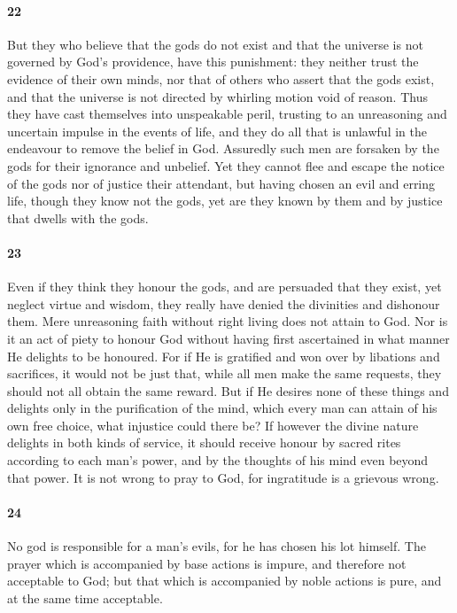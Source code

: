 \documentclass[12pt]{article}
\begin{document}
\paragraph{22} But they who believe that the gods do not exist and that the
universe is not governed by God's providence, have this punishment: they
neither trust the evidence of their own minds, nor that of others who assert
that the gods exist, and that the universe is not directed by whirling motion
void of reason. Thus they have cast themselves into unspeakable peril, trusting
to an unreasoning and uncertain impulse in the events of life, and they do all
that is unlawful in the endeavour to remove the belief in God. Assuredly such
men are forsaken by the gods for their ignorance and unbelief. Yet they cannot
flee and escape the notice of the gods nor of justice their attendant, but
having chosen an evil and erring life, though they know not the gods, yet are
they known by them and by justice that dwells with the gods.

\paragraph{23} Even if they think they honour the gods, and are persuaded that
they exist, yet neglect virtue and wisdom, they really have denied the
divinities and dishonour them. Mere unreasoning faith without right living does
not attain to God. Nor is it an act of piety to honour God without having first
ascertained in what manner He delights to be honoured. For if He is gratified
and won over by libations and sacrifices, it would not be just that, while all
men make the same requests, they should not all obtain the same reward. But if
He desires none of these things and delights only in the purification of the
mind, which every man can attain of his own free choice, what injustice could
there be? If however the divine nature delights in both kinds of service, it
should receive honour by sacred rites according to each man's power, and by the
thoughts of his mind even beyond that power. It is not wrong to pray to God,
for ingratitude is a grievous wrong.

\paragraph{24} No god is responsible for a man's evils, for he has chosen his
lot himself. The prayer which is accompanied by base actions is impure, and
therefore not acceptable to God; but that which is accompanied by noble actions
is pure, and at the same time acceptable.
\end{document}
